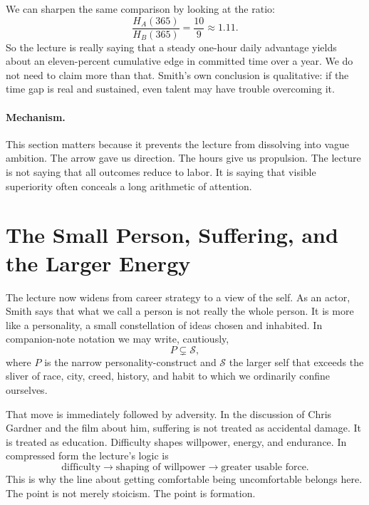 We can sharpen the same comparison by looking at the ratio:
\begin{equation}
\frac{H_A(365)}{H_B(365)}=\frac{10}{9}\approx 1.11.
\end{equation}
So the lecture is really saying that a steady one-hour daily advantage yields about an eleven-percent cumulative edge in committed time over a year. We do not need to claim more than that. Smith's own conclusion is qualitative: if the time gap is real and sustained, even talent may have trouble overcoming it.

\paragraph{Mechanism.}
This section matters because it prevents the lecture from dissolving into vague ambition. The arrow gave us direction. The hours give us propulsion. The lecture is not saying that all outcomes reduce to labor. It is saying that visible superiority often conceals a long arithmetic of attention.

\section{The Small Person, Suffering, and the Larger Energy}

The lecture now widens from career strategy to a view of the self. As an actor, Smith says that what we call a person is not really the whole person. It is more like a personality, a small constellation of ideas chosen and inhabited. In companion-note notation we may write, cautiously,
\begin{equation}
P \subsetneq \mathcal S,
\end{equation}
where \(P\) is the narrow personality-construct and \(\mathcal S\) the larger self that exceeds the sliver of race, city, creed, history, and habit to which we ordinarily confine ourselves.

That move is immediately followed by adversity. In the discussion of Chris Gardner and the film about him, suffering is not treated as accidental damage. It is treated as education. Difficulty shapes willpower, energy, and endurance. In compressed form the lecture's logic is
\begin{equation}
\text{difficulty}
\longrightarrow
\text{shaping of willpower}
\longrightarrow
\text{greater usable force}.
\end{equation}
This is why the line about getting comfortable being uncomfortable belongs here. The point is not merely stoicism. The point is formation.


